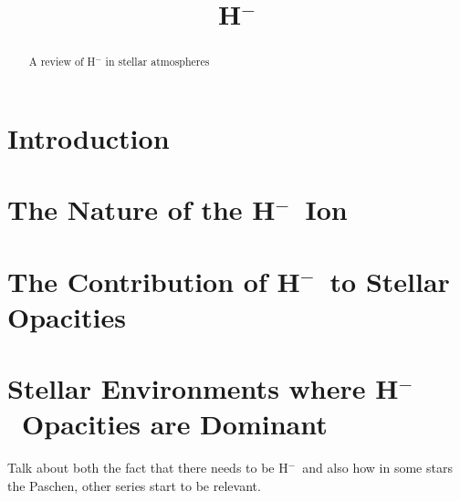 \documentclass{emulateapj}
\def\h{H$^-$}
\begin{document}
\begin{abstract}
A review of H$^-$ in stellar atmospheres
\end{abstract}

\title{\h}

\section{Introduction}


\section{The Nature of the \h\ Ion}


\section{The Contribution of \h\ to Stellar Opacities}


\section{Stellar Environments where \h\ Opacities are Dominant}
Talk about both the fact that there needs to be \h\ and also how in
some stars the Paschen, other series start to be relevant.



\end{document}
